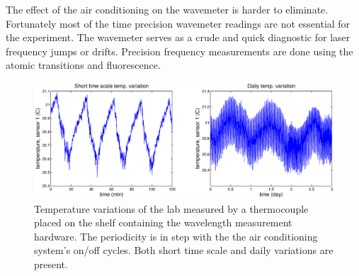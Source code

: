 The effect of the air conditioning on the wavemeter is harder to eliminate. Fortunately most of the time precision wavemeter readings are not essential for the experiment. The wavemeter serves as a crude and quick diagnostic for laser frequency jumps or drifts. Precision frequency measurements are done using the atomic transitions and fluorescence.

\begin{figure}[h!t]
\centering
\includegraphics[width=14.5cm]{chapter4/aircond/aircondsmall}
\caption[Lab temperature variations]{Temperature variations of the lab measured by a thermocouple placed on the shelf containing the wavelength measurement hardware. The periodicity is in step with the the air conditioning system's on/off cycles. Both short time scale and daily variations are present.}
\label{fig:airconditioning}
\end{figure} 


